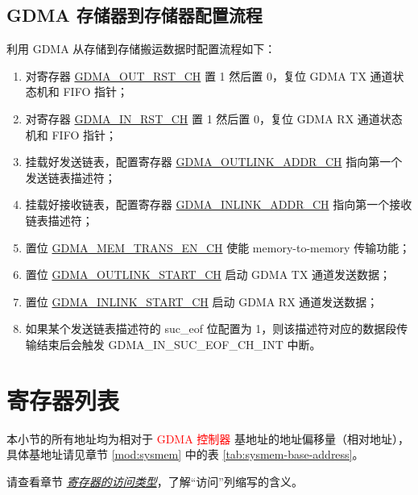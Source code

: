 \documentclass[main\_\_CN.tex]{subfiles}
\begin{document}
\subsection{GDMA 存储器到存储器配置流程}
利用 GDMA 从存储到存储搬运数据时配置流程如下：
\begin{enumerate}
    \item 对寄存器 \hyperref[fielddesc:DMAOUTRSTCHN]{GDMA\_OUT\_RST\_CH} 置 1 然后置 0，复位 GDMA TX 通道状态机和 FIFO 指针；
    \item 对寄存器 \hyperref[fielddesc:DMAINRSTCHN]{GDMA\_IN\_RST\_CH} 置 1 然后置 0，复位 GDMA RX 通道状态机和 FIFO 指针；
    \item 挂载好发送链表，配置寄存器 \hyperref[fielddesc:DMAOUTLINKADDRCHN]{GDMA\_OUTLINK\_ADDR\_CH} 指向第一个发送链表描述符；
    \item 挂载好接收链表，配置寄存器 \hyperref[fielddesc:DMAINLINKADDRCHN]{GDMA\_INLINK\_ADDR\_CH} 指向第一个接收链表描述符；
    \item 置位 \hyperref[fielddesc:DMAMEMTRANSENCHN]{GDMA\_MEM\_TRANS\_EN\_CH} 使能 memory-to-memory 传输功能；
    \item 置位 \hyperref[fielddesc:DMAOUTLINKSTARTCHN]{GDMA\_OUTLINK\_START\_CH} 启动 GDMA TX 通道发送数据；
    \item 置位 \hyperref[fielddesc:DMAINLINKSTARTCHN]{GDMA\_INLINK\_START\_CH} 启动 GDMA RX 通道发送数据；
    \item 如果某个发送链表描述符的 suc\_eof 位配置为 1，则该描述符对应的数据段传输结束后会触发 GDMA\_IN\_SUC\_EOF\_CH\_INT 中断。
\end{enumerate}




\clearpage
\hypertarget{dma-reg-summ}{}
\section{寄存器列表}
\label{sec:dma-reg-summ}

本小节的所有地址均为相对于 \textcolor{red}{GDMA 控制器} 基地址的地址偏移量（相对地址），具体基地址请见章节 \ref{mod:sysmem} \textit{} 中的表 \ref{tab:sysmem-base-address}。

请查看章节 \hyperref[glossary-access-types]{\textit{寄存器的访问类型}}，了解“访问”列缩写的含义。
\end{document}
